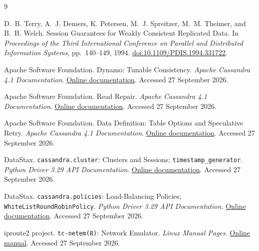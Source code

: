\documentclass[11pt,a4paper]{article}
\begin{document}
\begin{thebibliography}{9}
{}
D.~B. Terry, A.~J. Demers, K. Petersen, M.~J. Spreitzer, M.~M. Theimer, and B.~B. Welch.
Session Guarantees for Weakly Consistent Replicated Data.
In \emph{Proceedings of the Third International Conference on Parallel and Distributed Information Systems}, pp.~140--149, 1994.
\href{https://doi.org/10.1109/PDIS.1994.331722}{doi:10.1109/PDIS.1994.331722}.

Apache Software Foundation.
Dynamo: Tunable Consistency. \emph{Apache Cassandra 4.1 Documentation}.
\href{https://cassandra.apache.org/doc/4.1/cassandra/architecture/dynamo.html}{Online documentation}. Accessed 27 September 2026.

Apache Software Foundation.
Read Repair. \emph{Apache Cassandra 4.1 Documentation}.
\href{https://cassandra.apache.org/doc/4.1/cassandra/operating/read_repair.html}{Online documentation}. Accessed 27 September 2026.

Apache Software Foundation.
Data Definition: Table Options and Speculative Retry. \emph{Apache Cassandra 4.1 Documentation}.
\href{https://cassandra.apache.org/doc/4.1/cassandra/cql/ddl.html}{Online documentation}. Accessed 27 September 2026.

DataStax.
\texttt{cassandra.cluster}: Clusters and Sessions; \texttt{timestamp\_generator}.
\emph{Python Driver 3.29 API Documentation}.
\href{https://docs.datastax.com/en/developer/python-driver/3.29/api/cassandra/cluster/index.html}{Online documentation}. Accessed 27 September 2026.

DataStax.
\texttt{cassandra.policies}: Load-Balancing Policies; \texttt{WhiteListRoundRobinPolicy}.
\emph{Python Driver 3.29 API Documentation}.
\href{https://docs.datastax.com/en/developer/python-driver/3.29/api/cassandra/policies/index.html}{Online documentation}. Accessed 27 September 2026.

iproute2 project.
\texttt{tc-netem(8)}: Network Emulator. \emph{Linux Manual Pages}.
\href{https://www.man7.org/linux/man-pages/man8/netem.8.html}{Online manual}. Accessed 27 September 2026.
\end{thebibliography}
\endgroup
\clearpage
\appendix

\end{document}
